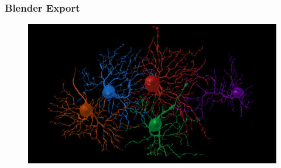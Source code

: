 \documentclass[12pt]{exam}
\begin{document}
	\subsubsection{Blender Export}
	\begin{figure}
		\includegraphics[width=\linewidth]{parasolRGCs}
		\label{blenderParasol}
	\end{figure}
\end{document}
